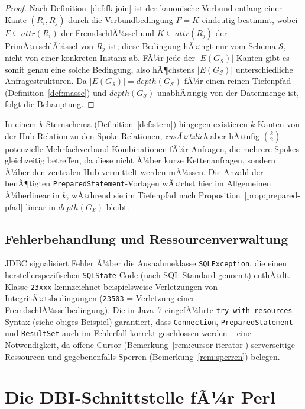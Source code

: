 ﻿\documentclass[a4paper,12pt]{report}
\theoremstyle{definition}
\theoremstyle{remark}
\newcommand{\att}{\mathit{attr}}
\newcommand{\depth}{\mathit{depth}}
\begin{document}
\begin{proof}
Nach Definition~\ref{def:fk-join} ist der kanonische Verbund entlang
einer Kante $(R_i,R_j)$ durch die Verbundbedingung $F=K$ eindeutig
bestimmt, wobei $F\subseteq\att(R_i)$ der FremdschlÃ¼ssel und
$K\subseteq\att(R_j)$ der PrimÃ¤rschlÃ¼ssel von $R_j$ ist; diese
Bedingung hÃ¤ngt nur vom Schema $\mathcal{S}$, nicht von einer
konkreten Instanz ab. FÃ¼r jede der $|E(G_{\mathcal{S}})|$ Kanten gibt
es somit genau eine solche Bedingung, also hÃ¶chstens
$|E(G_{\mathcal{S}})|$ unterschiedliche Anfragestrukturen. Da
$|E(G_{\mathcal{S}})| = \depth(G_{\mathcal{S}})$ fÃ¼r einen reinen
Tiefenpfad (Definition~\ref{def:masse}) und
$\depth(G_{\mathcal{S}})$ unabhÃ¤ngig von der Datenmenge ist, folgt die
Behauptung. \qedhere
\end{proof}

In einem $k$-Sternschema (Definition~\ref{def:stern}) hingegen
existieren $k$ Kanten von der Hub-Relation zu den Spoke-Relationen,
\emph{zusÃ¤tzlich} aber hÃ¤ufig $\binom{k}{2}$ potenzielle
Mehrfachverbund-Kombinationen fÃ¼r Anfragen, die mehrere Spokes
gleichzeitig betreffen, da diese nicht Ã¼ber kurze Kettenanfragen,
sondern Ã¼ber den zentralen Hub vermittelt werden mÃ¼ssen. Die Anzahl
der benÃ¶tigten \texttt{PreparedStatement}-Vorlagen wÃ¤chst hier im
Allgemeinen Ã¼berlinear in $k$, wÃ¤hrend sie im Tiefenpfad nach
Proposition~\ref{prop:prepared-pfad} linear in $\depth(G_{\mathcal{S}})$
bleibt.

\subsection{Fehlerbehandlung und Ressourcenverwaltung}

JDBC signalisiert Fehler Ã¼ber die Ausnahmeklasse
\texttt{SQLException}, die einen herstellerspezifischen
\texttt{SQLState}-Code (nach SQL-Standard genormt) enthÃ¤lt. Klasse
\texttt{23xxx} kennzeichnet beispielsweise Verletzungen von
IntegritÃ¤tsbedingungen (\texttt{23503} = Verletzung einer
FremdschlÃ¼sselbedingung). Die in Java~7 eingefÃ¼hrte
\texttt{try-with-resources}-Syntax (siehe obiges Beispiel) garantiert,
dass \texttt{Connection}, \texttt{PreparedStatement} und
\texttt{ResultSet} auch im Fehlerfall korrekt geschlossen werden --
eine Notwendigkeit, da offene Cursor (Bemerkung~\ref{rem:cursor-iterator})
serverseitige Ressourcen und gegebenenfalls Sperren
(Bemerkung~\ref{rem:sperren}) belegen.

\section{Die DBI-Schnittstelle fÃ¼r Perl}
\label{sec:perl-dbi}
\end{document}
